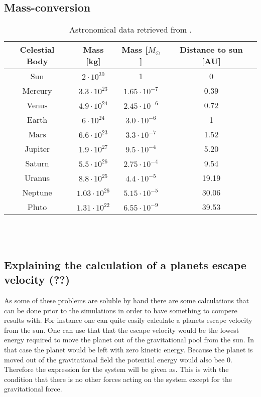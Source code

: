 \documentclass{article}
\begin{document}
\subsection{Mass-conversion} \label{app:mass}


    \begin{table}[H]
        \centering
        \caption{Astronomical data retrieved from \cite{solarsystemdata}. }
        \vspace{2mm}
        \label{tab:mass}
        \begin{tabular}{|c|c|c|c|}
            \hline
            Celestial Body & Mass [kg] & Mass [$M_{\odot}$] & Distance to sun [AU]\\
            \hline \hline
            Sun     & $ 2    \cdot10^{30} $ & 1                    & 0 \\
            Mercury & $ 3.3  \cdot10^{23} $ & $1.65 \cdot 10^{-7}$ & 0.39 \\
            Venus   & $ 4.9  \cdot10^{24} $ & $2.45 \cdot 10^{-6}$ & 0.72 \\
            Earth   & $ 6    \cdot10^{24} $ & $3.0 \cdot 10^{-6}$  & 1 \\
            Mars    & $ 6.6  \cdot10^{23} $ & $3.3 \cdot 10^{-7}$  & 1.52 \\
            Jupiter & $ 1.9  \cdot10^{27} $ & $9.5 \cdot 10^{-4}$  & 5.20 \\
            Saturn  & $ 5.5  \cdot10^{26} $ & $2.75 \cdot 10^{-4}$ & 9.54 \\
            Uranus  & $ 8.8  \cdot10^{25} $ & $4.4 \cdot 10^{-5}$  & 19.19 \\
            Neptune & $ 1.03 \cdot10^{26} $ & $5.15 \cdot 10^{-5}$ & 30.06 \\
            Pluto   & $ 1.31 \cdot10^{22} $ & $6.55 \cdot 10^{-9}$ & 39.53 \\
            \hline
        \end{tabular} \\
        \hspace{0pt}\\
    \end{table}

\subsection{Explaining the calculation of a planets escape velocity (??) } \label{sec:escapevelocity}

    As some of these problems are soluble by hand there are some calculations that can be done prior to the simulations in order to have something to compere results with. For instance one can quite easily calculate a planets escape velocity from the sun. One can use that that the escape velocity would be the lowest energy required to move the planet out of the gravitational pool from the sun. In that case the planet would be left with zero kinetic energy. Because the planet is moved out of the gravitational field the potential energy would also bee 0. Therefore the expression for the system will be given as. This is with the condition that there is no other forces acting on the system except for the gravitational force.   \\
\end{document}

